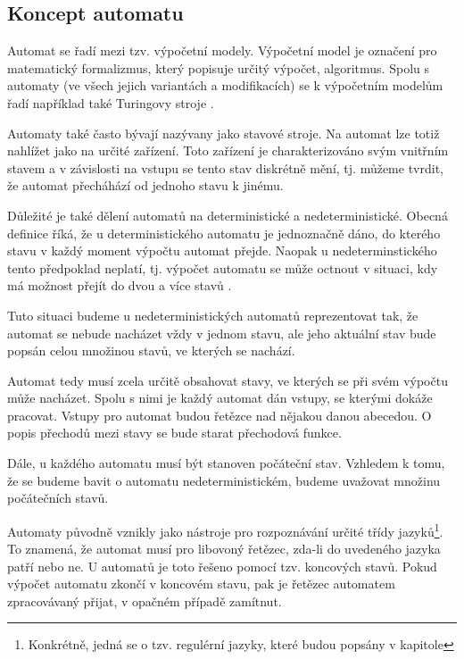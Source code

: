 \documentclass[a4paper,10pt]{article}
\begin{document}

\subsection{Koncept automatu}
Automat se řadí mezi tzv. výpočetní modely. Výpočetní model je označení pro matematický formalizmus, který popisuje určitý výpočet, algoritmus. Spolu s automaty (ve všech jejich variantách a modifikacích) se k výpočetním modelům řadí například také Turingovy stroje \cite{MorMal-FuzzyAutLang}. 

Automaty také často bývají nazývany jako stavové stroje. Na automat lze totiž nahlížet jako na určité zařízení. Toto zařízení je charakterizováno svým vnitřním stavem a v závislosti na vstupu se tento stav diskrétně mění, tj. můžeme tvrdit, že automat přecháhází od jednoho stavu k jinému.

Důležité je také dělení automatů na deterministické a nedeterministické. Obecná definice říká, že u deterministického automatu je jednoznačně dáno, do kterého stavu v každý moment výpočtu automat přejde. Naopak u nedeterminstického tento předpoklad neplatí, tj. výpočet automatu se může octnout v situaci, kdy má možnost přejít do dvou a více stavů .

Tuto situaci budeme u nedeterministických automatů reprezentovat tak, že automat se nebude nacházet vždy v jednom stavu, ale jeho aktuální stav bude popsán celou množinou stavů, ve kterých se nachází.

Automat tedy musí zcela určitě obsahovat stavy, ve kterých se při svém výpočtu může nacházet. Spolu s nimi je každý automat dán vstupy, se kterými dokáže pracovat. Vstupy pro automat budou řetězce nad nějakou danou abecedou. O popis přechodů mezi stavy se bude starat přechodová funkce.

Dále, u každého automatu musí být stanoven počáteční stav. Vzhledem k tomu, že se budeme bavit o automatu nedeterministickém, budeme uvažovat množinu počátečních stavů.

Automaty původně vznikly jako nástroje pro rozpoznávání určité třídy jazyků\footnote{Konkrétně, jedná se o tzv. regulérní jazyky, které budou popsány v kapitole }. To znamená, že automat musí pro libovoný řetězec, zda-li do uvedeného jazyka patří nebo ne. U automatů je toto řešeno pomocí tzv. koncových stavů. Pokud výpočet automatu zkončí v koncovém stavu, pak je řetězec automatem zpracovávaný přijat, v opačném případě zamítnut.
\end{document}
